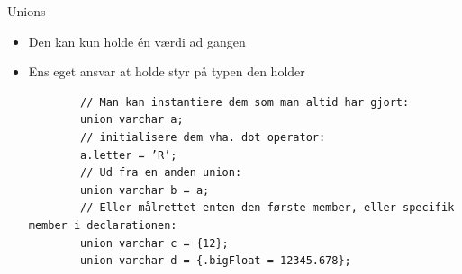 \documentclass{beamer}
\begin{document}

\begin{frame}[fragile]{Unions}
	\begin{itemize}
		\item{Den kan kun holde én værdi ad gangen}
		\item{Ens eget ansvar at holde styr på typen den holder}
		\begin{lstlisting}
		// Man kan instantiere dem som man altid har gjort:
		union varchar a;
		// initialisere dem vha. dot operator:
		a.letter = ’R’;
		// Ud fra en anden union:
		union varchar b = a;
		// Eller målrettet enten den første member, eller specifik member i declarationen:
		union varchar c = {12};
		union varchar d = {.bigFloat = 12345.678};
		\end{lstlisting}
	\end{itemize}
\end{frame}



\end{document}
